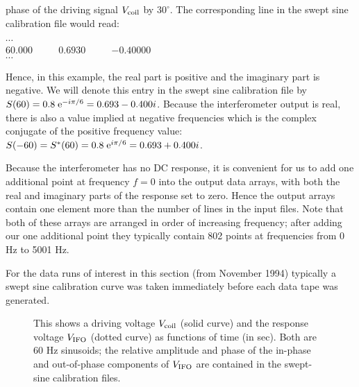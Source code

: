 phase of the driving signal $V_{\rm coil}$ by $30^\circ$.  The corresponding line
in the swept sine calibration file would read:
\begin{center}
$\cdots$\\
$60.000$ $\qquad$ $0.6930$ $\qquad$ $-0.40000$\\
$\cdots$
\end{center}
Hence, in this example, the real part is positive and the imaginary
part is negative.  We will denote this entry in the swept sine
calibration file by $S(60) = 0.8 \; {\rm e}^{ -i\pi/6} = 0.693 - 0.400
i$.  Because the interferometer output is real, there is also a value
implied at negative frequencies which is the complex conjugate of the
positive frequency value:  $S(-60) = S^*(60) = 0.8 \; {\rm e}^{
i\pi/6} = 0.693 + 0.400 i$.

Because the interferometer has no DC response, it is convenient for us
to add one additional point at frequency $f=0$ into the output data
arrays, with both the real and imaginary parts of the response set to
zero.  Hence the output arrays contain one element more than the number
of lines in the input files.  Note that both of these arrays are
arranged in order of increasing frequency; after adding our one
additional point they typically contain 802 points at frequencies from
0 Hz to 5001 Hz.

For the data runs of interest in this section (from
November 1994) typically a swept sine calibration curve was taken
immediately before each data tape was generated.

\begin{figure}[t]
\begin{center}
\caption{ \label{f:phaseF} This shows a driving voltage $V_{\rm coil}$
(solid curve) and the response voltage $V_{\rm IFO}$ (dotted curve) as
functions of time (in sec).  Both are 60 Hz sinusoids; the relative
amplitude and phase of the in-phase and out-of-phase components of
$V_{\rm IFO}$ are contained in the swept-sine calibration files.}
\end{center}
\end{figure}

